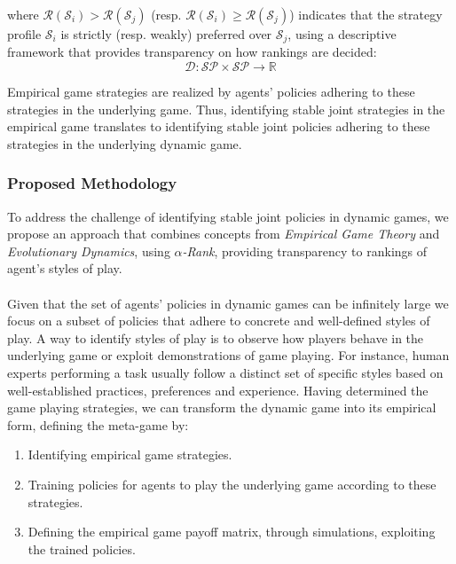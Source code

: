 \begin{flushleft}
\begin{flushleft}
        where $\mathcal{R}(\mathcal{S}_i) > \mathcal{R}(\mathcal{S}_j)$ (resp. $\mathcal{R}(\mathcal{S}_i) \geq \mathcal{R}(\mathcal{S}_j)$) indicates that the strategy profile $\mathcal{S}_i$ is strictly (resp. weakly) preferred over $\mathcal{S}_j$, using a descriptive framework that provides transparency on how rankings are decided:
        \begin{equation}
            \mathcal{D}: \mathcal{SP} \times \mathcal{SP} \to \mathbb{R}
            \label{eq:descriptive framework}
        \end{equation}

        Empirical game strategies are realized by agents' policies adhering to these strategies in the underlying game. Thus, identifying stable joint strategies in the empirical game translates to identifying stable joint policies adhering to these strategies in the underlying dynamic game.

    \end{flushleft}

    \subsubsection{Proposed Methodology}

    \begin{flushleft}

        To address the challenge of identifying stable joint policies in dynamic games, we propose an approach that combines concepts from \emph{Empirical Game Theory} and \emph{Evolutionary Dynamics}, using \emph{$\alpha$-Rank}, providing transparency to rankings of agent's styles of play.\\~\\

        Given that the set of agents' policies in dynamic games can be infinitely large we focus on a subset of policies that adhere to concrete and well-defined styles of play. A way to identify styles of play is to observe how players behave in the underlying game or exploit demonstrations of game playing. For instance, human experts performing a task usually follow a distinct set of specific styles based on well-established practices, preferences and experience. Having determined the game playing strategies, we can transform the dynamic game into its empirical form, defining the meta-game by:
        \begin{enumerate}[label=(\alph*)]
            \item Identifying empirical game strategies.
            \item Training policies for agents to play the underlying game according to these strategies.
            \item Defining the empirical game payoff matrix, through simulations, exploiting the trained policies.
        \end{enumerate}


\end{flushleft}
\end{flushleft}
